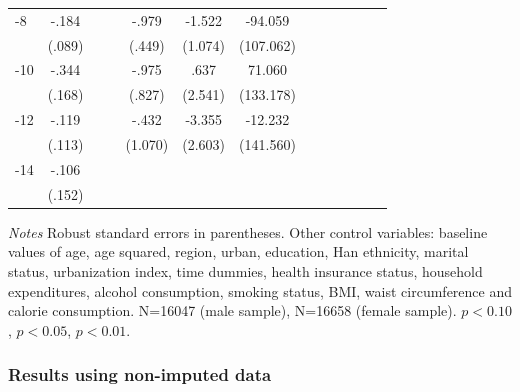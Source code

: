 \begin{table}[p]
\begin{adjustbox}{max width=\linewidth}
\begin{threeparttable}
{\begin{tabular}{l*{6}{S
S}}
-8             &    -.184\sym{**} &         &         &    -.979\sym{**} &   -1.522         &  -94.059         \\
                &   (.089)         &         &         &   (.449)         &  (1.074)         &(107.062)         \\
-10            &    -.344\sym{**} &         &         &    -.975         &     .637         &   71.060         \\
                &   (.168)         &         &         &   (.827)         &  (2.541)         &(133.178)         \\
-12           &    -.119         &         &         &    -.432         &   -3.355         &  -12.232         \\
                &   (.113)         &         &         &  (1.070)         &  (2.603)         &(141.560)         \\
-14           &    -.106         &         &         &                  &                  &                  \\
                &   (.152)         &         &         &                  &                  &                  \\
\bottomrule
\end{tabular}
\begin{tablenotes}
\item \textit{Notes}   Robust standard errors in parentheses.
Other control variables: baseline values of age, age squared, region, urban, education, Han ethnicity, marital status, urbanization index, time dummies, health insurance status, household expenditures, alcohol consumption, smoking status, BMI, waist circumference and calorie consumption. N=16047 (male sample), N=16658 (female sample). \sym{*} \(p<0.10\), \sym{**} \(p<0.05\), \sym{***} \(p<0.01\).
\end{tablenotes}
}
\end{threeparttable}
\end{adjustbox}
\end{table}

\FloatBarrier
\clearpage
\subsubsection*{Results using non-imputed data}


